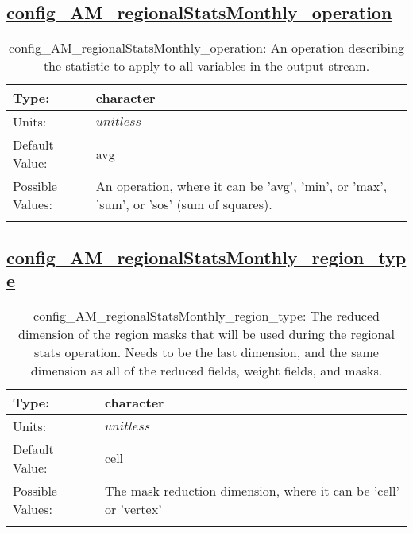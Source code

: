 \subsection[config\_AM\_regionalStatsMonthly\_operation]{\hyperref[sec:nm_tab_AM_regionalStatsMonthly]{config\_AM\_regionalStatsMonthly\_operation}}
\label{subsec:nm_sec_config_AM_regionalStatsMonthly_operation}
\begin{center}
\begin{longtable}{| p{2.0in} || p{4.0in} |}
    \hline
    Type: & character \\
    \hline
    Units: & $unitless$ \\
    \hline
    Default Value: & avg \\
    \hline
    Possible Values: & An operation, where it can be 'avg', 'min', or 'max', 'sum', or 'sos' (sum of squares). \\
    \hline
    \caption{config\_AM\_regionalStatsMonthly\_operation: An operation describing the statistic to apply to all variables in the output stream.}
\end{longtable}
\end{center}
\subsection[config\_AM\_regionalStatsMonthly\_region\_type]{\hyperref[sec:nm_tab_AM_regionalStatsMonthly]{config\_AM\_regionalStatsMonthly\_region\_type}}
\label{subsec:nm_sec_config_AM_regionalStatsMonthly_region_type}
\begin{center}
\begin{longtable}{| p{2.0in} || p{4.0in} |}
    \hline
    Type: & character \\
    \hline
    Units: & $unitless$ \\
    \hline
    Default Value: & cell \\
    \hline
    Possible Values: & The mask reduction dimension, where it can be 'cell' or 'vertex' \\
    \hline
    \caption{config\_AM\_regionalStatsMonthly\_region\_type: The reduced dimension of the region masks that will be used during the regional stats operation. Needs to be the last dimension, and the same dimension as all of the reduced fields, weight fields, and masks.}
\end{longtable}
\end{center}
